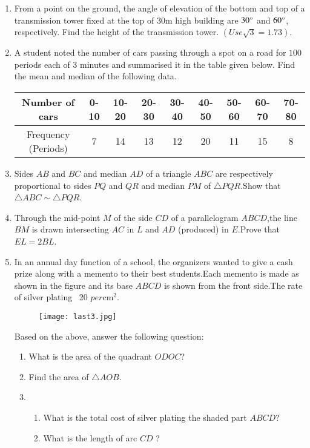 \documentclass[12pt,-letter paper]{article}
\providecommand{\brak}[1]{\ensuremath{\left(#1\right)}}
\begin{document}
\begin{enumerate}
\item From a point on the ground, the angle of elevation of the bottom and top of a transmission tower fixed at the top of $30 \mathrm{m}$ high building are $30\degree$ and $60\degree$, respectively. Find the height of the transmission tower. $\brak{Use\sqrt{3} = 1.73}$.

\item A student noted the number of cars passing through a spot on a road for $100$ periods each of $3$ minutes and summarised it in the table given below. Find the mean and median of the following data.\\

	\begin{tabular}{|c|c|c|c|c|c|c|c|c|}
\hline
Number of cars & 0-10 & 10-20 & 20-30 & 30-40 & 40-50 & 50-60 & 60-70 & 70-80\\ 
\hline
Frequency (Periods) & 7 & 14 & 13 & 12 & 20 & 11 & 15 & 8\\ 
\hline

\end{tabular}

\item Sides $AB$ and $BC$ and median $AD$ of a triangle $ABC$ are respectively proportional to sides $PQ$ and $QR$ and median $PM$ of $\triangle PQR$.Show that $\triangle ABC \sim \triangle PQR$.

\item Through the mid-point $M$ of the side $CD$ of a parallelogram $ABCD$,the line $BM$ is drawn intersecting $AC$ in $L$ and $AD$ (produced) in $E$.Prove that $EL = 2BL$. 

\item In an annual day function of a school, the organizers wanted to give a cash prize along with a memento to their best students.Each memento is made as shown in the figure and its base $ABCD$ is shown from the front side.The rate of silver plating \rupee~20 $per  \mathrm{cm}^2$.

	\begin{figure}[!ht]
		\centering
		\texttt{[image: last3.jpg]}
		\caption{}
		\label{fig:enter-label}
	\end{figure}

	\text Based on the above, answer the following question:
		\begin{enumerate}
			\item What is the area of the quadrant $ODOC$?
			\item Find the area of $\triangle AOB$.
			\item
			\begin{enumerate}
				\item What is the total cost of silver plating the shaded part $ABCD$?
				\item What is the length of arc $CD$ ?
			\end{enumerate}
		\end{enumerate}


\end{enumerate}
\end{document}
